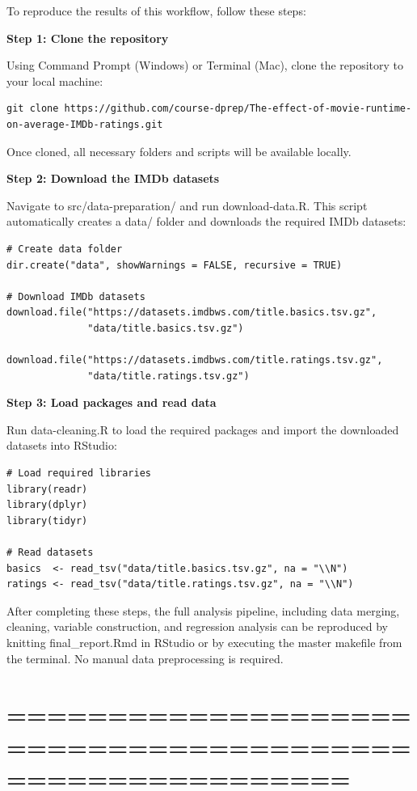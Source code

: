 \documentclass[
]{article}
\begin{document}
To reproduce the results of this workflow, follow these steps:

\textbf{Step 1: Clone the repository}

Using Command Prompt (Windows) or Terminal (Mac), clone the repository
to your local machine:

\begin{verbatim}
git clone https://github.com/course-dprep/The-effect-of-movie-runtime-on-average-IMDb-ratings.git
\end{verbatim}

Once cloned, all necessary folders and scripts will be available
locally.

\textbf{Step 2: Download the IMDb datasets}

Navigate to src/data-preparation/ and run download-data.R. This script
automatically creates a data/ folder and downloads the required IMDb
datasets:

\begin{verbatim}
# Create data folder
dir.create("data", showWarnings = FALSE, recursive = TRUE)

# Download IMDb datasets
download.file("https://datasets.imdbws.com/title.basics.tsv.gz",
              "data/title.basics.tsv.gz")

download.file("https://datasets.imdbws.com/title.ratings.tsv.gz",
              "data/title.ratings.tsv.gz")
\end{verbatim}

\textbf{Step 3: Load packages and read data}

Run data-cleaning.R to load the required packages and import the
downloaded datasets into RStudio:

\begin{verbatim}
# Load required libraries
library(readr)
library(dplyr)
library(tidyr)

# Read datasets
basics  <- read_tsv("data/title.basics.tsv.gz", na = "\\N")
ratings <- read_tsv("data/title.ratings.tsv.gz", na = "\\N")
\end{verbatim}

After completing these steps, the full analysis pipeline, including data
merging, cleaning, variable construction, and regression analysis can be
reproduced by knitting final\_report.Rmd in RStudio or by executing the
master makefile from the terminal. No manual data preprocessing is
required.

\section{=========================================================}\label{section-20}
\end{document}
